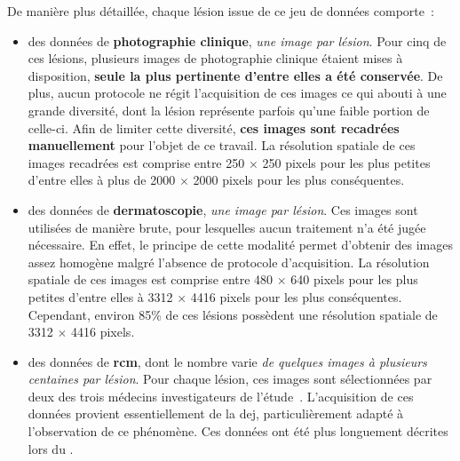 De manière plus détaillée, chaque lésion issue de ce jeu de données comporte~:
\begin{itemize}
    \item des données de \textbf{photographie clinique}, \textit{une image par lésion}. Pour cinq de ces lésions, plusieurs images de photographie clinique étaient mises à disposition, \textbf{seule la plus pertinente d'entre elles a été conservée}. De plus, aucun protocole ne régit l'acquisition de ces images ce qui abouti à une grande diversité, dont la lésion représente parfois qu'une faible portion de celle-ci. Afin de limiter cette diversité, \textbf{ces images sont recadrées manuellement} pour l'objet de ce travail. La résolution spatiale de ces images recadrées est comprise entre 250 $\times$ 250 pixels pour les plus petites d'entre elles à plus de 2000 $\times$ 2000 pixels pour les plus conséquentes.
    \item des données de \textbf{dermatoscopie}, \textit{une image par lésion}. Ces images sont utilisées de manière brute, pour lesquelles aucun traitement n'a été jugée nécessaire. En effet, le principe de cette modalité permet d'obtenir des images assez homogène malgré l'absence de protocole d'acquisition. La résolution spatiale de ces images est comprise entre 480 $\times$ 640 pixels pour les plus petites d'entre elles à 3312 $\times$ 4416 pixels pour les plus conséquentes. Cependant, environ 85\% de ces lésions possèdent une résolution spatiale de 3312 $\times$ 4416 pixels.
    \item des données de \textbf{\gls{rcm}}, dont le nombre varie \textit{de quelques images à plusieurs centaines par lésion}. Pour chaque lésion, ces images sont sélectionnées par deux des trois médecins investigateurs de l'étude~\cite{Cinotti2018}. L'acquisition de ces données provient essentiellement de la \gls{dej}, particulièrement adapté à l'observation de ce phénomène. Ces données ont été plus longuement décrites lors du .
\end{itemize}\par

